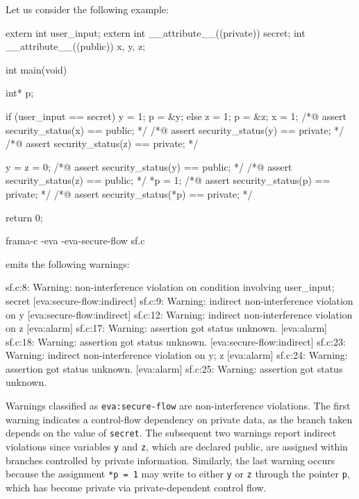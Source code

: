 \documentclass{frama-c-book}
\begin{document}
Let us consider the following example:
\begin{listing-nonumber}
extern int user_input;
extern int __attribute__((private)) secret;
int __attribute__((public)) x, y, z;

int main(void) {
  int* p;

  if (user_input == secret) {
    y = 1;
    p = &y;
  } else {
    z = 1;
    p = &z;
  }
  x = 1;
  /*@ assert security_status(x) == public; */
  /*@ assert security_status(y) == private; */
  /*@ assert security_status(z) == private; */

  y = z = 0;
  /*@ assert security_status(y) == public; */
  /*@ assert security_status(z) == public; */
  *p = 1;
  /*@ assert security_status(p) == private; */
  /*@ assert security_status(*p) == private; */

  return 0;
}
\end{listing-nonumber}

\begin{frama-c-commands}
frama-c -eva -eva-secure-flow sf.c
\end{frama-c-commands}

\Eva{} emits the following warnings:
\begin{logsmath}
 sf.c:8: Warning:
  non-interference violation on condition involving {user_input; secret}
[eva:secure-flow:indirect] sf.c:9: Warning:
  indirect non-interference violation on {y}
[eva:secure-flow:indirect] sf.c:12: Warning:
  indirect non-interference violation on {z}
[eva:alarm] sf.c:17: Warning: assertion got status unknown.
[eva:alarm] sf.c:18: Warning: assertion got status unknown.
[eva:secure-flow:indirect] sf.c:23: Warning:
  indirect non-interference violation on {y; z}
[eva:alarm] sf.c:24: Warning: assertion got status unknown.
[eva:alarm] sf.c:25: Warning: assertion got status unknown.
\end{logsmath}

Warnings classified as \lstinline|eva:secure-flow| are non-interference
violations. The first warning indicates a control-flow dependency on private
data, as the branch taken depends on the value of \lstinline|secret|. The
subsequent two warnings report indirect violations since variables \lstinline|y|
and \lstinline|z|, which are declared public, are assigned within branches
controlled by private information. Similarly, the last warning occurs because
the assignment \lstinline|*p = 1| may write to either \lstinline|y| or
\lstinline|z| through the pointer \lstinline|p|, which has become private via
private-dependent control flow.
\end{document}
